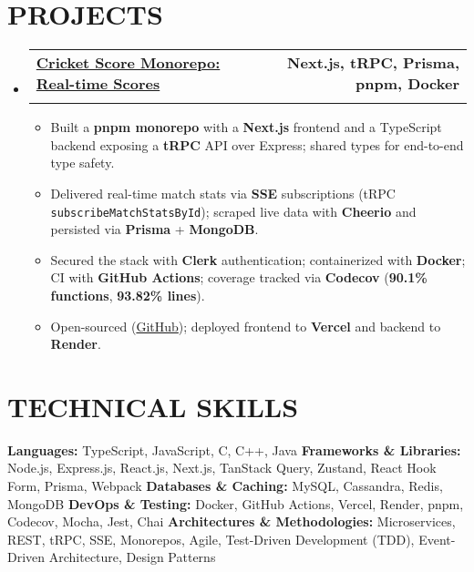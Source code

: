 \documentclass[letterpaper,11pt]{article}
\makeatletter
\newcommand{\resumeSubheading}[4]{
  \vspace{-2pt}\item
    \begin{tabular*}{1.0\textwidth}[t]{l@{\extracolsep{\fill}}r}
      \textbf{\large#1} & \textbf{\small #2} \\
      \textit{\large#3} & \textit{\small #4} \\
    \end{tabular*}\vspace{-7pt}
}
\newcommand{\resumeItem}[1]{
  \item\small{
    {#1 \vspace{-2pt}}
  }
}
\newcommand{\resumeSubHeadingListStart}{\begin{itemize}[leftmargin=0.0in, label={}]}
\newcommand{\resumeSubHeadingListEnd}{\end{itemize}}
\newcommand{\resumeItemListStart}{\begin{itemize}}
\newcommand{\resumeItemListEnd}{\end{itemize}\vspace{-5pt}}
\makeatother
\begin{document}
\section{PROJECTS}
  \resumeSubHeadingListStart
    \resumeSubheading
      {\href{https://cricscore.deveshsangwan.com/}{Cricket Score Monorepo: Real-time Scores \raisebox{-0.1\height}{\faLink}}}{Next.js, tRPC, Prisma, pnpm, Docker}{}{}
      \vspace{-10pt}
    \resumeItemListStart
        \resumeItem{Built a \textbf{pnpm monorepo} with a \textbf{Next.js} frontend and a TypeScript backend exposing a \textbf{tRPC} API over Express; shared types for end-to-end type safety.}
        \resumeItem{Delivered real-time match stats via \textbf{SSE} subscriptions (tRPC \texttt{subscribeMatchStatsById}); scraped live data with \textbf{Cheerio} and persisted via \textbf{Prisma} + \textbf{MongoDB}.}
        \resumeItem{Secured the stack with \textbf{Clerk} authentication; containerized with \textbf{Docker}; CI with \textbf{GitHub Actions}; coverage tracked via \textbf{Codecov} (\textbf{90.1\% functions}, \textbf{93.82\% lines}).}
        \resumeItem{Open-sourced (\href{https://github.com/deveshsangwan/cricketScoreApi}{GitHub}); deployed frontend to \textbf{Vercel} and backend to \textbf{Render}.}
    \resumeItemListEnd
  \resumeSubHeadingListEnd

\section{TECHNICAL SKILLS}
    \small{
    \textbf{Languages:} TypeScript, JavaScript, C, C++, Java \newline
    \textbf{Frameworks \& Libraries:} Node.js, Express.js, React.js, Next.js, TanStack Query, Zustand, React Hook Form, Prisma, Webpack \newline
    \textbf{Databases \& Caching:} MySQL, Cassandra, Redis, MongoDB \newline
    \textbf{DevOps \& Testing:} Docker, GitHub Actions, Vercel, Render, pnpm, Codecov, Mocha, Jest, Chai \newline
    \textbf{Architectures \& Methodologies:} Microservices, REST, tRPC, SSE, Monorepos, Agile, Test-Driven Development (TDD), Event-Driven Architecture, Design Patterns
    }

\end{document}
